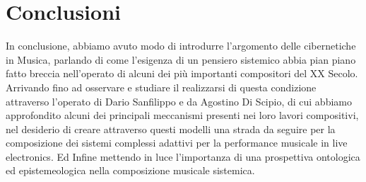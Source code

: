 

\section{Conclusioni}
\label{Conclusioni}


In conclusione, 
abbiamo avuto modo di introdurre l'argomento delle cibernetiche in Musica,
parlando di come l'esigenza di un pensiero sistemico 
abbia pian piano fatto breccia nell'operato
di alcuni dei più importanti compositori del XX Secolo. 
Arrivando fino ad osservare e studiare il realizzarsi di questa condizione
attraverso l'operato di Dario Sanfilippo e da Agostino Di Scipio, 
di cui abbiamo approfondito alcuni dei principali meccanismi presenti nei loro lavori compositivi,
nel desiderio di creare attraverso questi modelli
una strada da seguire per la composizione dei sistemi complessi adattivi per la
performance musicale in live electronics.
Ed Infine mettendo in luce l'importanza di una prospettiva 
ontologica ed epistemeologica nella composizione musicale sistemica.